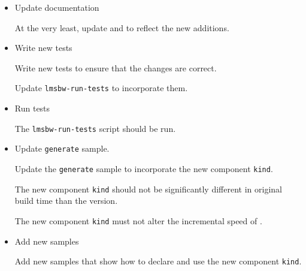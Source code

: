 \begin{itemize}
\item Update documentation

  At the very least, update  and 
  to reflect the new additions.

\item Write new tests

  Write new tests to ensure that the changes are correct.

  Update \texttt{lmsbw-run-tests} to incorporate them.

\item Run tests

  The \texttt{lmsbw-run-tests} script should be run.

\item Update \texttt{generate} sample.

  Update the \texttt{generate} sample to incorporate the new component
  \texttt{kind}.

  The new component \texttt{kind} should not be significantly
  different in original build time than the \makefile version.

  The new component \texttt{kind} must not alter the incremental
  speed of \lmsbw.

\item Add new samples

  Add new samples that show how to declare and use the new component
  \texttt{kind}.

\end{itemize}


